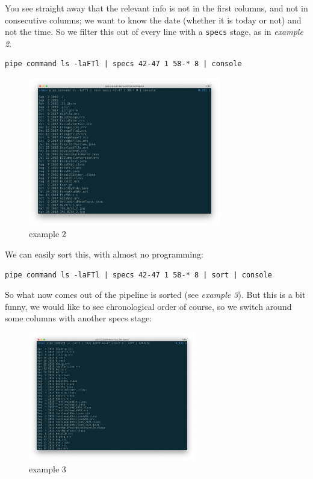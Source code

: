 You see straight away that the relevant info is not in the first
columns, and not in consecutive columns; we want to know the date
(whether it is today or not) and not the time. So we filter this out
of every line with a \texttt{specs} stage, as in \emph{example 2}.
\begin{lstlisting}
pipe command ls -laFTl | specs 42-47 1 58-* 8 | console
\end{lstlisting}
\begin{figure}[h]
  \includegraphics[width=0.75\textwidth]{images/example2.png}
  \caption{example 2}
  \label{fig:example2}
\end{figure}
We can easily sort this, with almost no programming:
\begin{lstlisting}
pipe command ls -laFTl | specs 42-47 1 58-* 8 | sort | console
\end{lstlisting}
So what now comes out of the pipeline is sorted (see \emph{example 3}).
But this is a bit funny, we would like to see chronological order of course, so we switch around some columns with another specs stage:
\begin{figure}[h]
  \includegraphics[width=0.65\textwidth]{images/example3.png}
  \caption{example 3}
  \label{fig:example3}
\end{figure}
